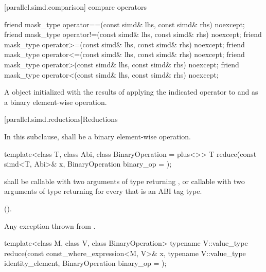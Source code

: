 [parallel.simd.comparison]{ compare operators}

\begin{itemdecl}
friend mask_type operator==(const simd& lhs, const simd& rhs) noexcept;
friend mask_type operator!=(const simd& lhs, const simd& rhs) noexcept;
friend mask_type operator>=(const simd& lhs, const simd& rhs) noexcept;
friend mask_type operator<=(const simd& lhs, const simd& rhs) noexcept;
friend mask_type operator>(const simd& lhs, const simd& rhs) noexcept;
friend mask_type operator<(const simd& lhs, const simd& rhs) noexcept;
\end{itemdecl}

\begin{itemdescr}
  \pnum\returns
  A  object initialized with the results of applying the indicated operator to  and  as a binary element-wise operation.
\end{itemdescr}

[parallel.simd.reductions]{Reductions}

\pnum
In this subclause,  shall be a binary element-wise operation.

\begin{itemdecl}
template<class T, class Abi, class BinaryOperation = plus<>>
  T reduce(const simd<T, Abi>& x, BinaryOperation binary_op = {});
\end{itemdecl}

\begin{itemdescr}
  \pnum\requires
   shall be callable with two arguments of type  returning , or callable with two arguments of type  returning  for every  that is an ABI tag type.

  \pnum\returns
   \foralli ().

  \pnum\throws
  Any exception thrown from .

\end{itemdescr}

\begin{itemdecl}
template<class M, class V, class BinaryOperation>
  typename V::value_type reduce(const const_where_expression<M, V>& x,
                                typename V::value_type identity_element,
                                BinaryOperation binary_op = {});
\end{itemdecl}

